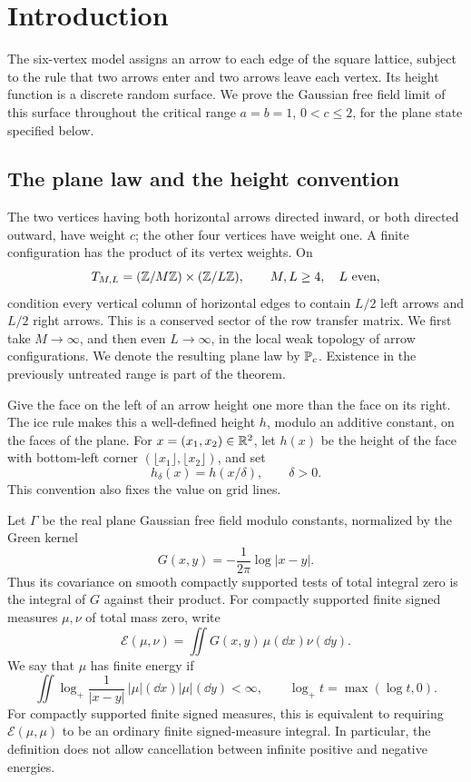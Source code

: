 \section{Introduction}\label{sec:introduction}

The six-vertex model assigns an arrow to each edge of the square lattice,
subject to the rule that two arrows enter and two arrows leave each vertex.
Its height function is a discrete random surface. We prove the Gaussian
free field limit of this surface throughout the critical range
\(a=b=1\), \(0<c\le2\), for the plane state specified below.

\subsection{The plane law and the height convention}

The two vertices having both horizontal arrows directed inward, or both
directed outward, have weight \(c\); the other four vertices have weight
one. A finite configuration has the product of its vertex weights.
On
\[
 T_{M,L}=(\Z/M\Z)\times(\Z/L\Z),\qquad M,L\ge4,\quad L\ \text{even},
\]
condition every vertical column of horizontal edges to contain \(L/2\)
left arrows and \(L/2\) right arrows. This is a conserved sector of the row
transfer matrix. We first take \(M\to\infty\), and then even \(L\to\infty\),
in the local weak topology of arrow configurations. We denote the resulting
plane law by \(\P_c\). Existence in the previously untreated range is part
of the theorem.

Give the face on the left of an arrow height one more than the face on its
right. The ice rule makes this a well-defined height \(h\), modulo an
additive constant, on the faces of the plane. For \(x=(x_1,x_2)\in\R^2\),
let \(h(x)\) be the height of the face with bottom-left corner
\((\lfloor x_1\rfloor,\lfloor x_2\rfloor)\), and set
\[
 h_\delta(x)=h(x/\delta),\qquad \delta>0.
\]
This convention also fixes the value on grid lines.

Let \(\Gamma\) be the real plane Gaussian free field modulo constants,
normalized by the Green kernel
\begin{equation}\label{eq:green}
 G(x,y)=-\frac1{2\pi}\log|x-y|.
\end{equation}
Thus its covariance on smooth compactly supported tests of total integral
zero is the integral of \(G\) against their product.
For compactly supported finite signed measures \(\mu,\nu\) of total mass
zero, write
\[
 \mathcal E(\mu,\nu)=\iint G(x,y)\,\mu(\dd x)\nu(\dd y).
\]
We say that \(\mu\) has finite energy if
\[
 \iint \log_+\frac1{|x-y|}\,|\mu|(\dd x)|\mu|(\dd y)<\infty,
 \qquad \log_+t=\max(\log t,0).
\]
For compactly supported finite signed measures, this is equivalent to
requiring \(\mathcal E(\mu,\mu)\) to be an ordinary finite
signed-measure integral. In particular, the definition does not allow
cancellation between infinite positive and negative energies.


